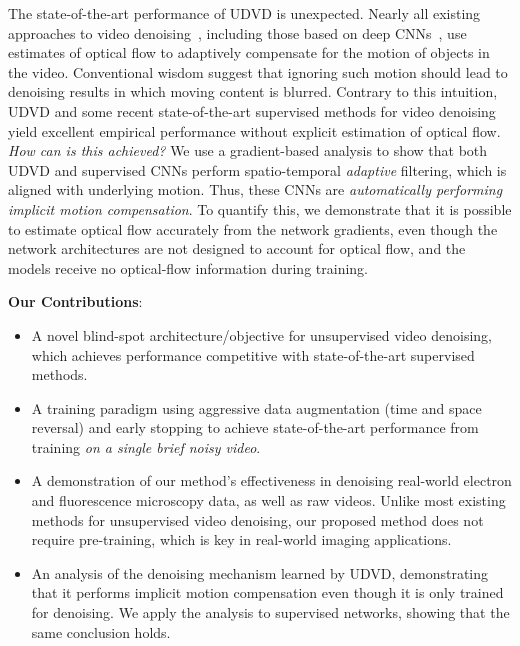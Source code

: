 \documentclass[final]{cvpr}
\begin{document}
The state-of-the-art performance of UDVD is unexpected. Nearly all existing approaches to video denoising~\cite{liu2010high, arias2018video, buades2016patch, vbm4d}, including those based on deep CNNs~\cite{dvdnet, xue2019video, f2f, F2F_extension, Yu_2020_CVPR_Workshops}, use estimates of optical flow to adaptively compensate for the motion of objects in the video. Conventional wisdom suggest that ignoring such motion should lead to denoising results in which moving content is blurred. Contrary to this intuition, UDVD and some recent state-of-the-art supervised methods for video denoising~\cite{fastdvdnet, vnlnet, videnn} yield excellent empirical performance without explicit estimation of optical flow. \emph{How can is this achieved?} We use a gradient-based analysis to show that both UDVD and supervised CNNs perform spatio-temporal \textit{adaptive} filtering, which is aligned with underlying motion. Thus, these CNNs are  \emph{automatically performing implicit motion compensation}. To quantify this, we demonstrate that it is possible to estimate optical flow accurately from the network gradients, even though the network architectures are not designed to account for optical flow, and the models receive no optical-flow information during training.


\noindent \textbf{Our Contributions}:
\begin{itemize}[leftmargin=*]
    \item A novel blind-spot architecture/objective for unsupervised video denoising, which achieves performance competitive with state-of-the-art supervised methods. 
    \item A training paradigm using aggressive data augmentation (time and space reversal) and early stopping to achieve state-of-the-art performance from training \emph{on a single brief noisy video}. 
    \item A demonstration of our method's effectiveness in denoising real-world electron and fluorescence microscopy data, as well as raw videos. Unlike most existing methods for unsupervised video denoising, our proposed method does not require pre-training, which is key in real-world imaging applications.
    \item An analysis of the denoising mechanism learned by UDVD, demonstrating that it performs implicit motion compensation even though it is only trained for denoising. We apply the analysis to supervised networks, showing that the same conclusion holds. 
\end{itemize}
\end{document}
